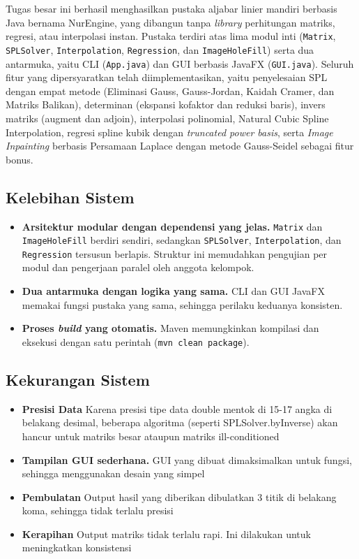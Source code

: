 \documentclass[12pt,a4paper]{report}
\begin{document}
Tugas besar ini berhasil menghasilkan pustaka aljabar linier mandiri berbasis Java
bernama NurEngine, yang dibangun tanpa \textit{library} perhitungan matriks,
regresi, atau interpolasi instan. Pustaka terdiri atas lima modul inti
(\verb|Matrix|, \verb|SPLSolver|, \verb|Interpolation|, \verb|Regression|, dan
\verb|ImageHoleFill|) serta dua antarmuka, yaitu CLI (\verb|App.java|) dan GUI
berbasis JavaFX (\verb|GUI.java|). Seluruh fitur yang dipersyaratkan telah
diimplementasikan, yaitu penyelesaian SPL dengan empat metode (Eliminasi Gauss,
Gauss-Jordan, Kaidah Cramer, dan Matriks Balikan), determinan (ekspansi
kofaktor dan reduksi baris), invers matriks (augment dan adjoin), interpolasi
polinomial, Natural Cubic Spline Interpolation, regresi spline kubik dengan
\textit{truncated power basis}, serta \textit{Image Inpainting} berbasis
Persamaan Laplace dengan metode Gauss-Seidel sebagai fitur bonus.

\subsection{Kelebihan Sistem}

\begin{itemize}
    \item \textbf{Arsitektur modular dengan dependensi yang jelas.}
          \verb|Matrix| dan \verb|ImageHoleFill| berdiri sendiri, sedangkan
          \verb|SPLSolver|, \verb|Interpolation|, dan \verb|Regression|
          tersusun berlapis. Struktur ini memudahkan pengujian per modul dan
          pengerjaan paralel oleh anggota kelompok.
    \item \textbf{Dua antarmuka dengan logika yang sama.} CLI dan GUI JavaFX
          memakai fungsi pustaka yang sama, sehingga perilaku keduanya
          konsisten.
    \item \textbf{Proses \textit{build} yang otomatis.} Maven memungkinkan
          kompilasi dan eksekusi dengan satu perintah (\verb|mvn clean package|).
\end{itemize}

\subsection{Kekurangan Sistem}

\begin{itemize}
    \item \textbf{Presisi Data}
        Karena presisi tipe data double mentok di 15-17 angka di belakang desimal, beberapa algoritma (seperti SPLSolver.byInverse) akan hancur untuk matriks besar ataupun matriks ill-conditioned
    \item \textbf{Tampilan GUI sederhana.}
        GUI yang dibuat dimaksimalkan untuk fungsi, sehingga menggunakan desain yang simpel
    \item \textbf{Pembulatan}
        Output hasil yang diberikan dibulatkan 3 titik di belakang koma, sehingga tidak terlalu presisi
    \item \textbf{Kerapihan}
        Output matriks tidak terlalu rapi. Ini dilakukan untuk meningkatkan konsistensi
        
\end{itemize}
\end{document}

